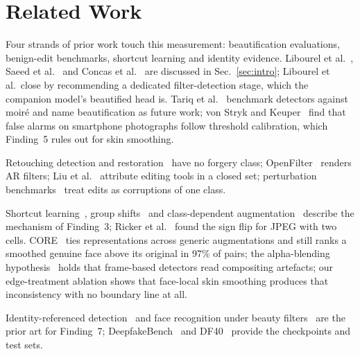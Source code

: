 \documentclass[journal]{IEEEtran}  %
\begin{document}
\section{Related Work}
\label{sec:related}
Four strands of prior work touch this measurement: beautification evaluations, benign-edit benchmarks, shortcut learning and identity evidence. Libourel et al.~\cite{libourel2024}, Saeed et al.~\cite{saeed2025} and Concas et al.~\cite{concas2025} are discussed in
Sec.~\ref{sec:intro}; Libourel et al.\ close by recommending a dedicated filter-detection stage, which the companion model's
beautified head is. Tariq et al.~\cite{moire2025} benchmark detectors against moir\'e and name beautification as future work; von Stryk and
Keuper~\cite{laionmobile2026} find that false alarms on smartphone photographs follow threshold calibration, which Finding~5
rules out for skin smoothing.

Retouching detection and
restoration~\cite{bharati2016,jain2018,wang2019photoshop,retouchingffhq,frrffusion,mofrr,reface} have no forgery class;
OpenFilter~\cite{openfilter2022} renders AR filters; Liu et al.~\cite{miea2026} attribute editing tools in a closed set;
perturbation benchmarks~\cite{deeperforensics2020,hendrycks2019} treat edits as corruptions of one class.

Shortcut learning~\cite{geirhos2020}, group shifts~\cite{sagawa2020} and class-dependent augmentation~\cite{balestriero2022} describe
the mechanism of Finding~3; Ricker et al.~\cite{ricker2026biasid} found the sign flip for JPEG with two cells. CORE~\cite{core}
ties representations across generic augmentations and still ranks a smoothed genuine face above its original in 97\% of
pairs; the alpha-blending hypothesis~\cite{alphablend2026} holds that frame-based detectors read compositing artefacts; our
edge-treatment ablation shows that face-local skin smoothing produces that inconsistency with no boundary line at all.

Identity-referenced detection~\cite{identitydriven2020,idreveal2021,ict2022,yin2026,vipguard2025} and face recognition under beauty filters~\cite{mirabet2025} are the prior art for Finding~7; DeepfakeBench~\cite{deepfakebench} and
DF40~\cite{df40} provide the checkpoints and test sets.

\end{document}
